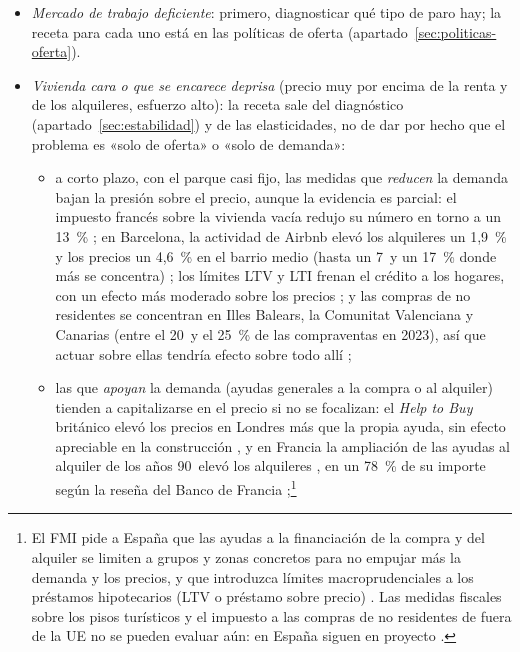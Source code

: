 \documentclass[11pt]{article}
\begin{document}
\begin{itemize}
\item \emph{Mercado de trabajo deficiente}: primero, diagnosticar qué tipo de paro hay; la receta para cada uno está en las políticas de oferta (apartado~\ref{sec:politicas-oferta}).
\item \emph{Vivienda cara o que se encarece deprisa} (precio muy por encima de la renta y de los alquileres, esfuerzo alto): la receta sale del diagnóstico (apartado~\ref{sec:estabilidad}) y de las elasticidades, no de dar por hecho que el problema es «solo de oferta» o «solo de demanda»:
  \begin{itemize}
  \item a corto plazo, con el parque casi fijo, las medidas que \emph{reducen} la demanda bajan la presión sobre el precio, aunque la evidencia es parcial: el impuesto francés sobre la vivienda vacía redujo su número en torno a un 13~\% \parencite{Segu2020Vacantes}; en Barcelona, la actividad de Airbnb elevó los alquileres un 1,9~\% y los precios un 4,6~\% en el barrio medio (hasta un 7~y un 17~\% donde más se concentra) \parencite{GarciaLopez2020Airbnb}; los límites LTV y LTI frenan el crédito a los hogares, con un efecto más moderado sobre los precios \parencite{Alam2019Macroprudencial}; y las compras de no residentes se concentran en Illes Balears, la Comunitat Valenciana y Canarias (entre el 20~y el 25~\% de las compraventas en 2023), así que actuar sobre ellas tendría efecto sobre todo allí \parencite[págs.~246-247]{BdE2024Vivienda};
  \item las que \emph{apoyan} la demanda (ayudas generales a la compra o al alquiler) tienden a capitalizarse en el precio si no se focalizan: el \emph{Help to Buy} británico elevó los precios en Londres más que la propia ayuda, sin efecto apreciable en la construcción \parencite{Carozzi2024HelpToBuy}, y en Francia la ampliación de las ayudas al alquiler de los años 90~elevó los alquileres \parencite{Fack2006Ayudas}, en un 78~\% de su importe según la reseña del Banco de Francia \parencite{BdF2023AyudasVivienda};\footnote{El FMI pide a España que las ayudas a la financiación de la compra y del alquiler se limiten a grupos y zonas concretos para no empujar más la demanda y los precios, y que introduzca límites macroprudenciales a los préstamos hipotecarios (LTV o préstamo sobre precio) \parencite[págs.~25-26 y 80]{FMI2026ArticuloIV}. Las medidas fiscales sobre los pisos turísticos y el impuesto a las compras de no residentes de fuera de la UE no se pueden evaluar aún: en España siguen en proyecto \parencite[págs.~82-84]{FMI2026ArticuloIV}.}

\end{itemize}
\end{itemize}
\end{document}
